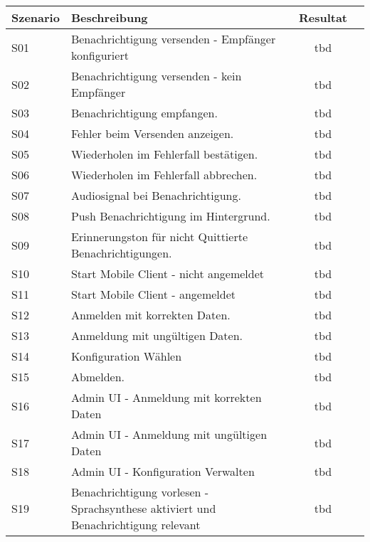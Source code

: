 \begin{table}[h]
    \centering
    \begin{tabular}{|l|p{11cm}|c|c|}
        \hline
        \textbf{Szenario} & \textbf{Beschreibung} & \textbf{Resultat} \\
        \hline
        S01         & Benachrichtigung versenden - Empfänger konfiguriert   & tbd\\
        \hline
        S02         & Benachrichtigung versenden - kein Empfänger & tbd\\
        \hline
        S03         & Benachrichtigung empfangen.  & tbd\\
        \hline
        S04         & Fehler beim Versenden anzeigen.  & tbd\\
        \hline
        S05         & Wiederholen im Fehlerfall bestätigen.  & tbd\\
        \hline
        S06         & Wiederholen im Fehlerfall abbrechen.  & tbd\\
        \hline
        S07         & Audiosignal bei Benachrichtigung.   & tbd\\
        \hline
        S08         & Push Benachrichtigung im Hintergrund.  & tbd\\
        \hline
        S09         & Erinnerungston für nicht Quittierte Benachrichtigungen.   & tbd\\
        \hline
        S10         & Start Mobile Client - nicht angemeldet   & tbd\\
        \hline
        S11         & Start Mobile Client  - angemeldet & tbd\\
        \hline
        S12         & Anmelden mit korrekten Daten.   & tbd\\
        \hline
        S13         & Anmeldung mit ungültigen Daten.   & tbd\\
        \hline
        S14         & Konfiguration Wählen   & tbd\\
        \hline
        S15         & Abmelden.   & tbd\\
        \hline
        S16         & Admin UI - Anmeldung mit korrekten Daten   & tbd\\
        \hline
        S17         & Admin UI - Anmeldung mit ungültigen Daten   & tbd\\
        \hline
        S18         & Admin UI - Konfiguration Verwalten   & tbd\\
        \hline
        S19         & Benachrichtigung vorlesen - Sprachsynthese aktiviert und Benachrichtigung relevant & tbd\\

\end{tabular}
\end{table}
